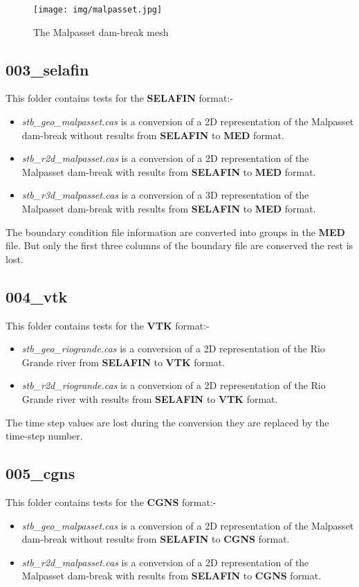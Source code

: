 \documentclass[a4paper,10pt]{article}
\newcommand{\slf}{\textbf{SELAFIN}\xspace}
\newcommand{\med}{\textbf{MED}\xspace}
\newcommand{\vtk}{\textbf{VTK}\xspace}
\newcommand{\cgns}{\textbf{CGNS}\xspace}
\begin{document}
\begin{figure}[ht]
  \centering
  \texttt{[image: img/malpasset.jpg]}
  \caption{The Malpasset dam-break mesh}
  \label{malpasset}
\end{figure}

\subsection{003\_selafin}

This folder contains tests for the \slf format:-
\begin{itemize}
\item \textit{stb\_geo\_malpasset.cas} is a conversion of a 2D representation of the Malpasset dam-break without results 
from \slf to \med format.
\item \textit{stb\_r2d\_malpasset.cas} is a conversion of a 2D representation of the Malpasset dam-break with results 
from \slf to \med format.
\item \textit{stb\_r3d\_malpasset.cas} is a conversion of a 3D representation of the Malpasset dam-break with results 
from \slf to \med format.
\end{itemize}
The boundary condition file information are converted into groups in the \med file. 
But only the first three columns of the boundary file are conserved the rest is lost.

\subsection{004\_vtk}

This folder contains tests for the \vtk format:-
\begin{itemize}
\item \textit{stb\_geo\_riogrande.cas} is a conversion of a 2D representation of the Rio Grande river 
from \slf to \vtk format.
\item \textit{stb\_r2d\_riogrande.cas} is a conversion of a 2D representation of the Rio Grande river 
with results from \slf to \vtk format.
\end{itemize}
The time step values are lost during the conversion they are replaced by the time-step number.

\subsection{005\_cgns}

This folder contains tests for the \cgns format:-
\begin{itemize}
\item \textit{stb\_geo\_malpasset.cas} is a conversion of a 2D representation of the Malpasset dam-break without results 
from \slf to \cgns format.
\item \textit{stb\_r2d\_malpasset.cas} is a conversion of a 2D representation of the Malpasset dam-break with results 
from \slf to \cgns format.
\end{itemize}
\end{document}
